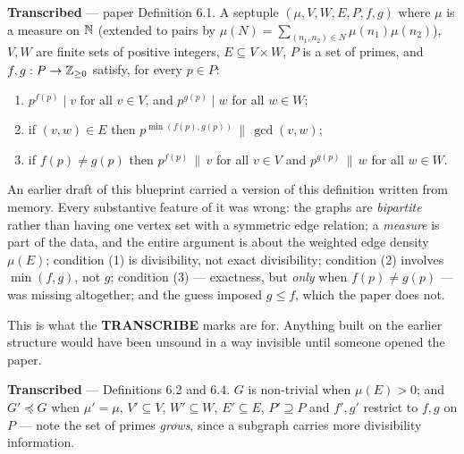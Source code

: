 \begin{definition}
  \label{def:gcdgraph}
  \leanok
  \textbf{Transcribed} --- paper Definition 6.1. A septuple $(\mu, V, W, E, P, f, g)$
  where $\mu$ is a measure on $\mathbb{N}$ (extended to pairs by
  $\mu(N) = \sum_{(n_1,n_2)\in N}\mu(n_1)\mu(n_2)$), $V, W$ are finite sets of positive
  integers, $E \subseteq V \times W$, $P$ is a set of primes, and
  $f, g : P \to \mathbb{Z}_{\geq 0}$ satisfy, for every $p \in P$:
  \begin{enumerate}
    \item $p^{f(p)} \mid v$ for all $v \in V$, and $p^{g(p)} \mid w$ for all $w \in W$;
    \item if $(v,w) \in E$ then $p^{\min(f(p),g(p))} \,\|\, \gcd(v,w)$;
    \item if $f(p) \neq g(p)$ then $p^{f(p)} \,\|\, v$ for all $v \in V$ and
      $p^{g(p)} \,\|\, w$ for all $w \in W$.
  \end{enumerate}
\end{definition}

\begin{remark}
  An earlier draft of this blueprint carried a version of this definition written from
  memory. Every substantive feature of it was wrong: the graphs are \emph{bipartite}
  rather than having one vertex set with a symmetric edge relation; a \emph{measure} is
  part of the data, and the entire argument is about the weighted edge density $\mu(E)$;
  condition (1) is divisibility, not exact divisibility; condition (2) involves
  $\min(f,g)$, not $g$; condition (3) --- exactness, but \emph{only} when
  $f(p) \neq g(p)$ --- was missing altogether; and the guess imposed $g \leq f$, which the
  paper does not.

  This is what the \textbf{TRANSCRIBE} marks are for. Anything built on the earlier
  structure would have been unsound in a way invisible until someone opened the paper.
\end{remark}

\begin{definition}
  \label{def:gcdsubgraph}
  \leanok
  \textbf{Transcribed} --- Definitions 6.2 and 6.4. $G$ is non-trivial when $\mu(E) > 0$;
  and $G' \preccurlyeq G$ when $\mu' = \mu$, $V' \subseteq V$, $W' \subseteq W$,
  $E' \subseteq E$, $P' \supseteq P$ and $f', g'$ restrict to $f, g$ on $P$ --- note the
  set of primes \emph{grows}, since a subgraph carries more divisibility information.
\end{definition}

